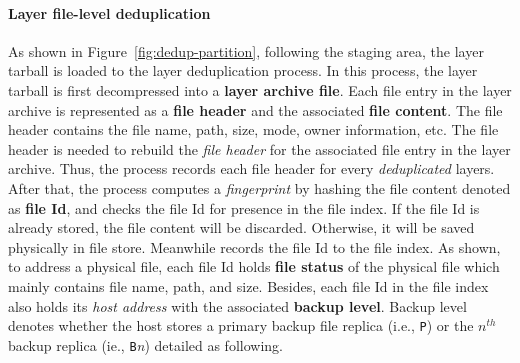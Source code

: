 \paragraph{Layer file-level deduplication}
As shown in Figure~\ref{fig:dedup-partition}, 
following the staging area, the layer tarball is loaded to the layer deduplication process.
In this process, the layer tarball is first decompressed into a \textbf{layer archive file}.
Each file entry in the layer archive is represented as a \textbf{file header} and the associated \textbf{file content}.
The file header contains the file name, path, size, mode, owner information, etc.
The file header is needed to rebuild the \emph{file header} for 
the associated file entry in the layer archive.
Thus, 
the process records each file header for every \emph{deduplicated} layers. 
After that,
the process computes a \emph{fingerprint} by hashing the file content denoted as \textbf{file Id}, 
and checks the file Id for presence in the file index.
If the file Id is already stored, the file content will be discarded. 
Otherwise, it will be saved physically in file store.
Meanwhile
\sysname records the file Id to the file index.
As shown, %
%
to address a physical file, 
each file Id holds 
\textbf{file status} of the physical file which mainly contains file name, path, and size.
Besides, 
each file Id in the file index also holds its \emph{host address} with the associated \textbf{backup level}.
Backup level denotes whether the host stores a primary backup file replica (i.e., \texttt{P}) or the $n^{th}$ backup replica (ie., \texttt{B}\emph{n}) detailed as following.

